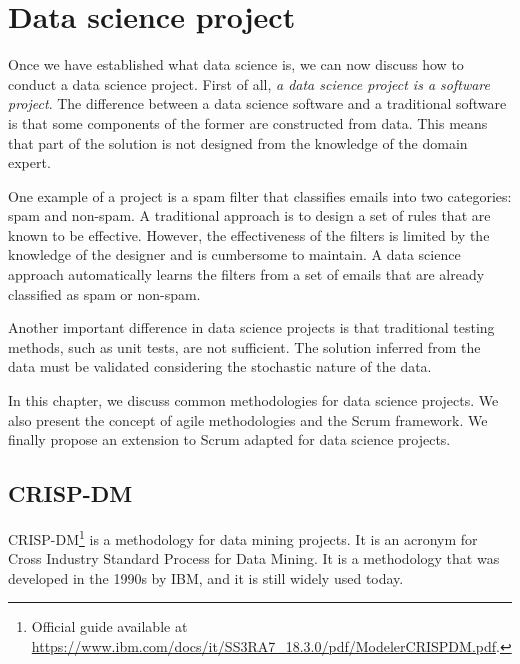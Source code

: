 \chapter{Data science project}
\label{chap:project}
\glsresetall

Once we have established what data science is, we can now discuss how to conduct a data science
project.
First of all, \emph{a data science project is a software project}.  The difference between a data
science software and a traditional software is that some components of the former are
constructed from data.  This means that part of the solution is not designed from the
knowledge of the domain expert.

One example of a project is a spam filter that
classifies emails into two categories: spam and non-spam.  A traditional approach is
to design a set of rules that are known to be effective.  However, the effectiveness of
the filters is limited by the knowledge of the designer and is cumbersome to maintain.  A
data science approach automatically learns the filters from a set of
emails that are already classified as spam or non-spam.

Another important difference in data science projects is that traditional testing methods,
such as unit tests, are not sufficient. The solution inferred from the data must be validated
considering the stochastic nature of the data.

In this chapter, we discuss common methodologies for data science projects.  We also
present the concept of agile methodologies and the Scrum framework.  We finally propose an
extension to Scrum adapted for data science projects.

\section{CRISP-DM}

CRISP-DM\footnote{Official guide available at
\url{https://www.ibm.com/docs/it/SS3RA7_18.3.0/pdf/ModelerCRISPDM.pdf}.} is a methodology
for data mining projects.  It is an acronym for Cross Industry Standard Process for Data
Mining.  It is a methodology that was developed in the 1990s by IBM, and it is still
widely used today.

